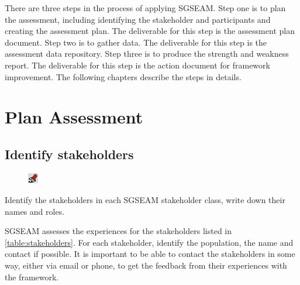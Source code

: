\documentclass[11pt,oneside]{book}
\begin{document}
There are three steps in the process of applying SGSEAM. Step one is to plan the assessment, including identifying the stakeholder and participants and creating the assessment plan. The deliverable for this step is the assessment plan document. Step two is to gather data. The deliverable for this step is the assessment data repository. Step three is to produce the strength and weakness report. The deliverable for this step is the action document for framework improvement. The following chapters describe the steps in details.

\chapter{Plan Assessment}

\section{Identify stakeholders}

\begin{shadebox}
\begin{figure}
\vspace{-15pt}\hspace{-10pt}
    \includegraphics[width=0.04\textwidth]{note-icon}
\end{figure}

Identify the stakeholders in each SGSEAM stakeholder class, write down their names and roles.

\end{shadebox}

SGSEAM assesses the experiences for the stakeholders listed in \autoref{table:stakeholders}. For each stakeholder, identify the population, the name and contact if possible. It is important to be able to contact the stakeholders in some way, either via email or phone, to get the feedback from their experiences with the framework.
\end{document}
